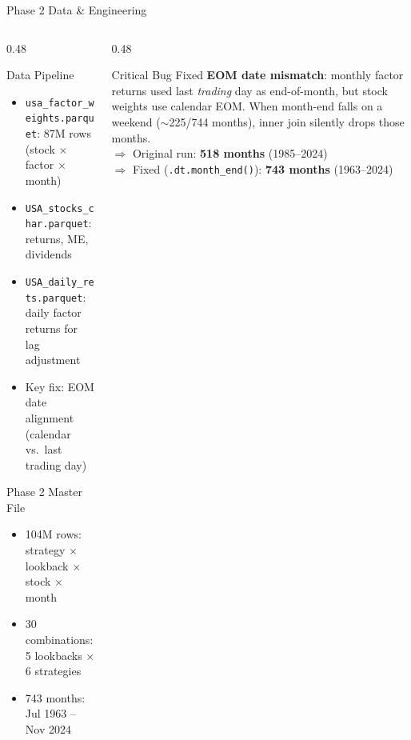 \documentclass[
  ignorenonframetext,
  aspectratio=169]{beamer}
\begin{document}
\begin{frame}{Phase 2 Data \& Engineering}
\label{phase-2-data-engineering}
\begin{columns}[T]
\begin{column}{0.48\textwidth}
\begin{block}{Data Pipeline}
\begin{itemize}
\item \texttt{usa\_factor\_weights.parquet}: 87M rows (stock $\times$ factor $\times$ month)
\item \texttt{USA\_stocks\_char.parquet}: returns, ME, dividends
\item \texttt{USA\_daily\_rets.parquet}: daily factor returns for lag adjustment
\item Key fix: EOM date alignment (calendar vs.\ last trading day)
\end{itemize}
\end{block}
\begin{block}{Phase 2 Master File}
\begin{itemize}
\item 104M rows: strategy $\times$ lookback $\times$ stock $\times$ month
\item 30 combinations: 5 lookbacks $\times$ 6 strategies
\item 743 months: Jul 1963 -- Nov 2024
\end{itemize}
\end{block}
\end{column}
\begin{column}{0.48\textwidth}
\begin{block}{Critical Bug Fixed}
\textbf{EOM date mismatch}: monthly factor returns used last \emph{trading} day as end-of-month, but stock weights use calendar EOM. When month-end falls on a weekend ($\sim$225/744 months), inner join silently drops those months.\\
\medskip
$\Rightarrow$ Original run: \textbf{518 months} (1985--2024)\\
$\Rightarrow$ Fixed (\texttt{.dt.month\_end()}): \textbf{743 months} (1963--2024)
\end{block}
\end{column}
\end{columns}
\end{frame}
\end{document}
